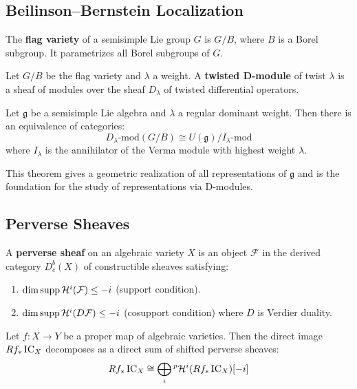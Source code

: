\subsection{Beilinson--Bernstein Localization}

\begin{definition}
The \textbf{flag variety} of a semisimple Lie group $G$ is $G/B$, where $B$ is a Borel subgroup. It parametrizes all Borel subgroups of $G$.
\end{definition}

\begin{definition}
Let $G/B$ be the flag variety and $\lambda$ a weight. A \textbf{twisted D-module} of twist $\lambda$ is a sheaf of modules over the sheaf $D_\lambda$ of twisted differential operators.
\end{definition}

\begin{theorem}
Let $\mathfrak{g}$ be a semisimple Lie algebra and $\lambda$ a regular dominant weight. Then there is an equivalence of categories:
\[
D_\lambda\text{-mod}(G/B) \cong U(\mathfrak{g})/I_\lambda\text{-mod}
\]
where $I_\lambda$ is the annihilator of the Verma module with highest weight $\lambda$.
\end{theorem}

This theorem gives a geometric realization of all representations of $\mathfrak{g}$ and is the foundation for the study of representations via D-modules.

\subsection{Perverse Sheaves}

\begin{definition}
A \textbf{perverse sheaf} on an algebraic variety $X$ is an object $\mathcal{F}$ in the derived category $D^b_c(X)$ of constructible sheaves satisfying:
\begin{enumerate}
    \item $\dim \operatorname{supp} \mathcal{H}^i(\mathcal{F}) \leq -i$ (support condition).
    \item $\dim \operatorname{supp} \mathcal{H}^i(D\mathcal{F}) \leq -i$ (cosupport condition) where $D$ is Verdier duality.
\end{enumerate}
\end{definition}

\begin{theorem}
Let $f: X \to Y$ be a proper map of algebraic varieties. Then the direct image $Rf_* \operatorname{IC}_X$ decomposes as a direct sum of shifted perverse sheaves:
\[
Rf_* \operatorname{IC}_X \cong \bigoplus_i {}^p\mathcal{H}^i(Rf_* \operatorname{IC}_X)[-i]
\]
\end{theorem}

